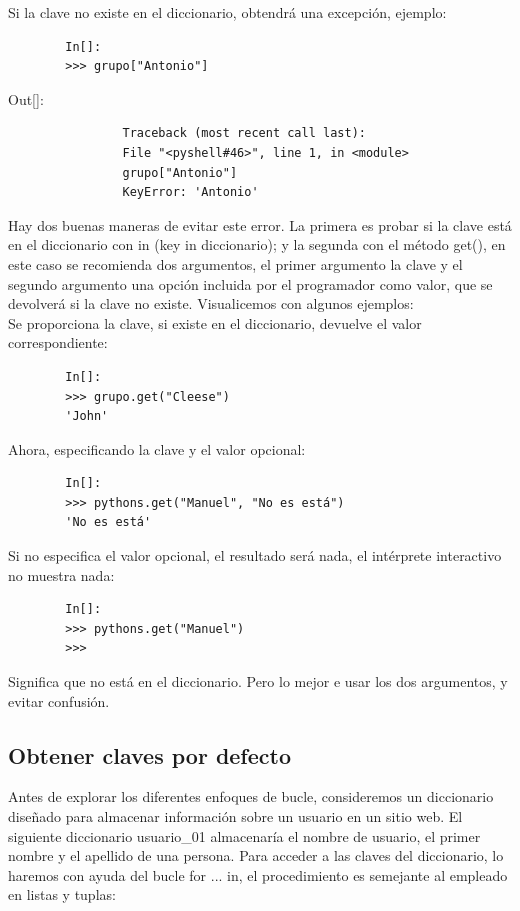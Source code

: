 	
	Si la clave no existe en el diccionario, obtendrá una excepción, ejemplo:
	
	\begin{lstlisting}
		In[]:
		>>> grupo["Antonio"]
	\end{lstlisting}
	{\ttfamily\scriptsize\scriptsize\noindent Out[]: \vspace{-0.3cm}	
		{\color{red} 	
			\begin{verbatim}
				Traceback (most recent call last):
				File "<pyshell#46>", line 1, in <module>
				grupo["Antonio"]
				KeyError: 'Antonio'
			\end{verbatim}
	}}
	
	
	Hay dos buenas maneras de evitar este error. La primera es probar si la clave está en el diccionario con {\ttfamily in} ({\ttfamily key in diccionario}); y la segunda con el método {\ttfamily get()}, en este caso
	se recomienda dos argumentos, el primer argumento  la clave y el segundo argumento una opción incluida por el programador como valor, que se devolverá si la clave no existe. Visualicemos con algunos ejemplos:\\ 
	
	Se proporciona la clave, si existe en el diccionario, devuelve el valor correspondiente:
	\begin{lstlisting}
		In[]:	
		>>> grupo.get("Cleese")
		'John'
	\end{lstlisting}
	
	Ahora, especificando la clave y el valor opcional:\label{valor_predet}
	
	\begin{lstlisting}
		In[]:	
		>>> pythons.get("Manuel", "No es está")
		'No es está'
	\end{lstlisting}
	
	Si no especifica  el valor opcional, el resultado será nada, el intérprete interactivo no muestra nada:
	\begin{lstlisting}
		In[]:	
		>>> pythons.get("Manuel")
		>>> 
	\end{lstlisting}
	
	Significa que no está en el diccionario. Pero lo mejor e usar los dos argumentos, y evitar confusión.
	
	\subsection{Obtener claves por defecto}\label{predeterminado}
	
	Antes de explorar los diferentes enfoques de bucle, consideremos un diccionario diseñado para almacenar información sobre un usuario en un sitio web. El siguiente diccionario {\ttfamily usuario\_01}\label{usuario.01} almacenaría el nombre de usuario, el primer nombre y el apellido de una persona. Para acceder a las claves del diccionario, lo haremos con ayuda del bucle {\ttfamily for ... in},  el procedimiento es semejante al empleado en listas y tuplas:
	
